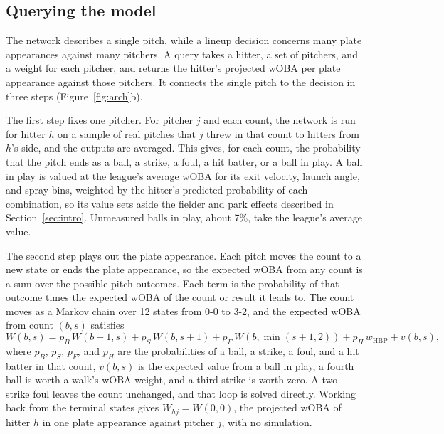\subsection{Querying the model}
\label{sec:query}

The network describes a single pitch, while a lineup decision concerns many plate appearances against many pitchers. A query takes a hitter, a set of pitchers, and a weight for each pitcher, and returns the hitter's projected wOBA per plate appearance against those pitchers. It connects the single pitch to the decision in three steps (Figure~\ref{fig:arch}b).

The first step fixes one pitcher. For pitcher $j$ and each count, the network is run for hitter $h$ on a sample of real pitches that $j$ threw in that count to hitters from $h$'s side, and the outputs are averaged. This gives, for each count, the probability that the pitch ends as a ball, a strike, a foul, a hit batter, or a ball in play. A ball in play is valued at the league's average wOBA for its exit velocity, launch angle, and spray bins, weighted by the hitter's predicted probability of each combination, so its value sets aside the fielder and park effects described in Section~\ref{sec:intro}. Unmeasured balls in play, about 7\%, take the league's average value.

The second step plays out the plate appearance. Each pitch moves the count to a new state or ends the plate appearance, so the expected wOBA from any count is a sum over the possible pitch outcomes. Each term is the probability of that outcome times the expected wOBA of the count or result it leads to. The count moves as a Markov chain over 12 states from 0-0 to 3-2, and the expected wOBA from count $(b,s)$ satisfies
\begin{equation}
W(b,s) = p_B\, W(b+1,s) + p_S\, W(b,s+1) + p_F\, W(b,\min(s+1,2)) + p_H\, w_{\text{HBP}} + v(b,s),
\label{eq:chain}
\end{equation}
where $p_B$, $p_S$, $p_F$, and $p_H$ are the probabilities of a ball, a strike, a foul, and a hit batter in that count, $v(b,s)$ is the expected value from a ball in play, a fourth ball is worth a walk's wOBA weight, and a third strike is worth zero. A two-strike foul leaves the count unchanged, and that loop is solved directly. Working back from the terminal states gives $W_{hj} = W(0,0)$, the projected wOBA of hitter $h$ in one plate appearance against pitcher $j$, with no simulation.


